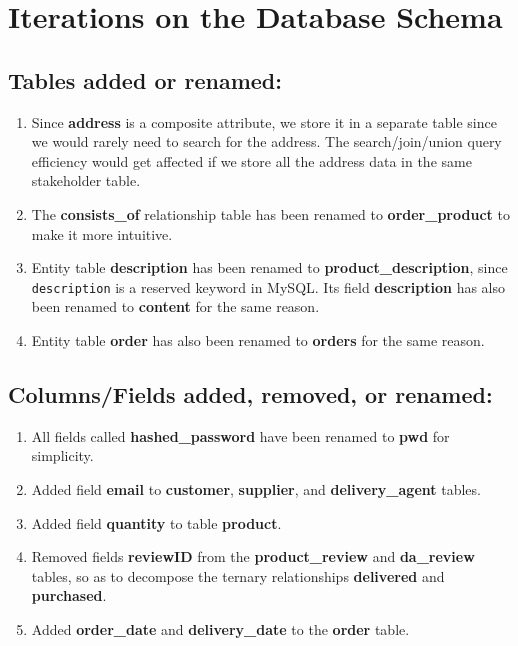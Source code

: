 
\section*{\Huge Iterations on the Database Schema}
\subsection*{Tables added or renamed:}
\begin{enumerate}
    \item
    Since \textbf{address} is a composite attribute, we store it in a separate table since we would rarely need to search for the address.
    The search/join/union query efficiency would get affected if we store all the address data in the same stakeholder table.
    \item
    The \textbf{consists\_of} relationship table has been renamed to \textbf{order\_product} to make it more intuitive.
    \item
    Entity table \textbf{description} has been renamed to \textbf{product\_description}, since \newline \texttt{description} is a reserved keyword in MySQL.
    Its field \textbf{description} has also been renamed to \textbf{content} for the same reason.
    \item
    Entity table \textbf{order} has also been renamed to \textbf{orders} for the same reason.
\end{enumerate}

\subsection*{Columns/Fields added, removed, or renamed:}
\begin{enumerate}
    \item
    All fields called \textbf{hashed\_password} have been renamed to \textbf{pwd} for simplicity.
    \item
    Added field \textbf{email} to \textbf{customer}, \textbf{supplier}, and \textbf{delivery\_agent} tables.
    \item
    Added field \textbf{quantity} to table \textbf{product}.
    \item
    Removed fields \textbf{reviewID} from the \textbf{product\_review} and \textbf{da\_review} tables,
    so as to decompose the ternary relationships \textbf{delivered} and \textbf{purchased}.
    \item
    Added \textbf{order\_date} and \textbf{delivery\_date} to the \textbf{order} table.
\end{enumerate}

